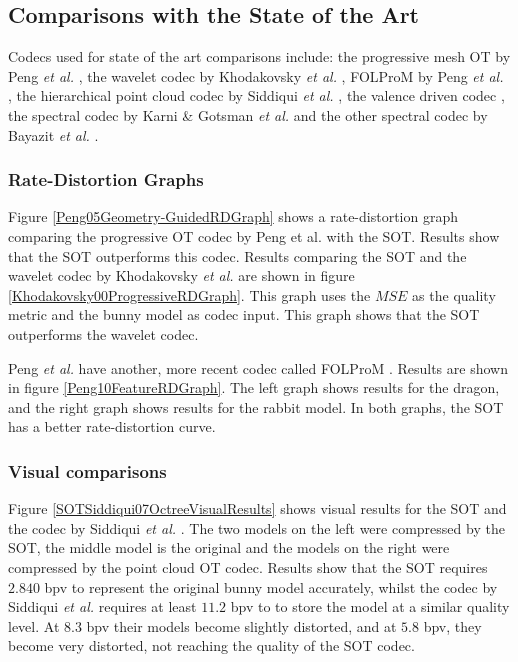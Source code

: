 \subsection{Comparisons with the State of the Art}

Codecs used for state of the art comparisons include: the progressive mesh OT by Peng \textit{et al.} \cite{Peng05Geometry-Guided}, the wavelet codec by Khodakovsky \textit{et al.} \cite{Khodakovsky00Progressive}, FOLProM by Peng \textit{et al.} \cite{Peng10Feature}, the hierarchical point cloud codec by Siddiqui \textit{et al.} \cite{Siddiqui07Octree}, the valence driven codec \cite{touma98triangle}, the spectral codec by Karni \& Gotsman \textit{et al.} \cite{Karni00Spectral} and the other spectral codec by Bayazit \textit{et al.} \cite{Bayazit103DMesh}. 

\subsubsection{Rate-Distortion Graphs}

Figure \ref{Peng05Geometry-GuidedRDGraph} shows a rate-distortion graph comparing the progressive OT codec by Peng et al. \cite{Peng05Geometry-Guided} with the SOT.  Results show that the SOT outperforms this codec. Results comparing the SOT and the wavelet codec by Khodakovsky \textit{et al.} \cite{Khodakovsky00Progressive} are shown in figure \ref{Khodakovsky00ProgressiveRDGraph}. This graph uses the $MSE$ as the quality metric and the bunny model as codec input. This graph shows that the SOT outperforms the wavelet codec.


Peng \textit{et al.} have another, more recent codec called FOLProM  \cite{Peng10Feature}. Results are shown in figure \ref{Peng10FeatureRDGraph}. The left graph shows results for the dragon, and the right graph shows results for the rabbit model. In both graphs, the SOT has a better rate-distortion curve.

\subsubsection{Visual comparisons}

Figure \ref{SOTSiddiqui07OctreeVisualResults} shows visual results for the SOT and the codec by Siddiqui \textit{et al.} \cite{Siddiqui07Octree}. The two models on the left were compressed by the SOT, the middle model is the original and the models on the right were compressed by the point cloud OT codec. Results show that the SOT requires $2.840$ bpv to represent the original bunny model accurately, whilst the codec by Siddiqui \textit{et al.} requires at least $11.2$ bpv to to store the model at a similar quality level. At $8.3$ bpv their models become slightly distorted, and at $5.8$ bpv, they become very distorted, not reaching the quality of the SOT codec.
 

